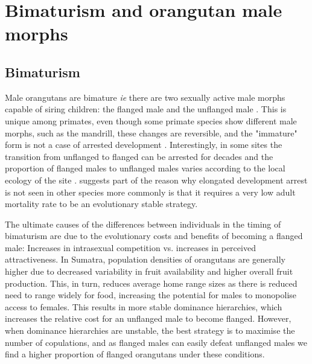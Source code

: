 \section{Bimaturism and orangutan male morphs}
\subsection{Bimaturism}
Male orangutans are bimature \textit{ie} there are two sexually active male morphs capable of siring children: the flanged male and the unflanged male \citep{Galdikas.1985}. This is unique among primates, even though some primate species show different male morphs, such as the mandrill, these changes are reversible, and the "immature" form is not a case of arrested development \citep{Setchell.2001}. Interestingly, in some sites the transition from unflanged to flanged can be arrested for decades and the proportion of flanged males to unflanged males varies according to the local ecology of the site \citep{Dunkel.2013xnm, Kunz.2023}. \citet{Pradhan.2012} suggests part of the reason why elongated development arrest is not seen in other species more commonly is that it requires a very low adult mortality rate to be an evolutionary stable strategy.  

The ultimate causes of the differences between individuals in the timing of bimaturism are due to the evolutionary costs and benefits of becoming a flanged male: Increases in intrasexual competition vs. increases in perceived attractiveness. In Sumatra, population densities of orangutans are generally higher due to decreased variability in fruit availability and higher overall fruit production. This, in turn, reduces average home range sizes as there is reduced need to range widely for food, increasing the potential for males to monopolise access to females. This results in more stable dominance hierarchies, which increases the relative cost for an unflanged male to become flanged. However, when dominance hierarchies are unstable, the best strategy is to maximise the number of copulations, and as flanged males can easily defeat unflanged males we find a higher proportion of flanged orangutans under these conditions.

